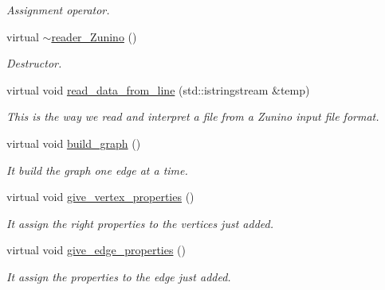 \begin{DoxyCompactItemize}
\begin{DoxyCompactList}\small\item\em Assignment operator. \item\end{DoxyCompactList}\item 
\hypertarget{classreader__Zunino_a28ccfbc66df3f25aebdcda73d4f7a596}{
virtual \hyperlink{classreader__Zunino_a28ccfbc66df3f25aebdcda73d4f7a596}{$\sim$reader\_\-Zunino} ()}
\label{classreader__Zunino_a28ccfbc66df3f25aebdcda73d4f7a596}

\begin{DoxyCompactList}\small\item\em Destructor. \item\end{DoxyCompactList}\item 
\hypertarget{classreader__Zunino_a66fb4a93601534d8c8e8f22230bfe4d6}{
virtual void \hyperlink{classreader__Zunino_a66fb4a93601534d8c8e8f22230bfe4d6}{read\_\-data\_\-from\_\-line} (std::istringstream \&temp)}
\label{classreader__Zunino_a66fb4a93601534d8c8e8f22230bfe4d6}

\begin{DoxyCompactList}\small\item\em This is the way we read and interpret a file from a Zunino input file format. \item\end{DoxyCompactList}\item 
\hypertarget{classreader__Zunino_ae4abac1454512c91464fdca90468f89a}{
virtual void \hyperlink{classreader__Zunino_ae4abac1454512c91464fdca90468f89a}{build\_\-graph} ()}
\label{classreader__Zunino_ae4abac1454512c91464fdca90468f89a}

\begin{DoxyCompactList}\small\item\em It build the graph one edge at a time. \item\end{DoxyCompactList}\item 
\hypertarget{classreader__Zunino_a28dca55912d3ca4040d1bed361fbd66a}{
virtual void \hyperlink{classreader__Zunino_a28dca55912d3ca4040d1bed361fbd66a}{give\_\-vertex\_\-properties} ()}
\label{classreader__Zunino_a28dca55912d3ca4040d1bed361fbd66a}

\begin{DoxyCompactList}\small\item\em It assign the right properties to the vertices just added. \item\end{DoxyCompactList}\item 
\hypertarget{classreader__Zunino_a7380966cad11dfc8c316b03e8d67c253}{
virtual void \hyperlink{classreader__Zunino_a7380966cad11dfc8c316b03e8d67c253}{give\_\-edge\_\-properties} ()}
\label{classreader__Zunino_a7380966cad11dfc8c316b03e8d67c253}

\begin{DoxyCompactList}\small\item\em It assign the properties to the edge just added. \item\end{DoxyCompactList}\end{DoxyCompactItemize}
